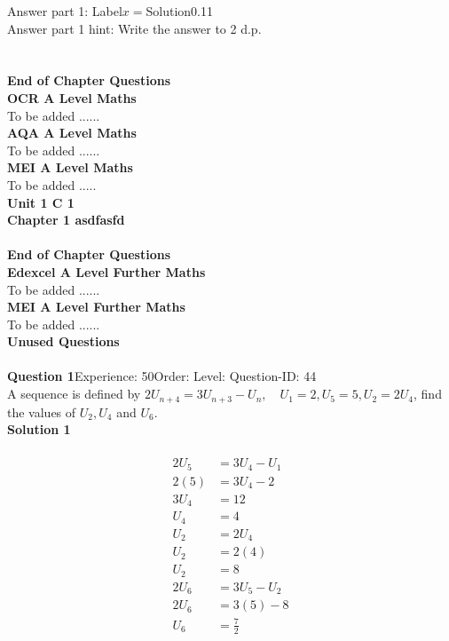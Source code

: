 \documentclass{article}
\begin{document}
Answer part 1: \hspace{10pt}Label\hspace{10pt}$x=$\hspace{10pt}Solution\hspace{10pt}0.11\\
Answer part 1 hint: \hspace{15pt}Write the answer to 2 d.p.\\
\\[4pt]
\\[2pt]
\noindent\large{\textbf{End of Chapter Questions}}\\[15pt]
\noindent\Huge{\textbf{OCR A Level Maths}}\\[5pt]
\noindent\large{To be added ......}\\[20pt]
\noindent\Huge{\textbf{AQA A Level Maths}}\\[5pt]
\noindent\large{To be added ......}\\[20pt]
\noindent\Huge{\textbf{MEI A Level Maths}}\\[5pt]
\noindent\large{To be added .....}\\[20pt]
\noindent\huge{\textbf{Unit 1 C 1}}\\[18pt]
\noindent\huge{\textbf{Chapter 1 asdfasfd}}\\[15pt]
\\[2pt]
\noindent\large{\textbf{End of Chapter Questions}}\\[15pt]
\noindent\Huge{\textbf{Edexcel A Level Further Maths}}\\[5pt]
\noindent\large{To be added ......}\\[20pt]
\noindent\Huge{\textbf{MEI A Level Further Maths}}\\[5pt]
\noindent\large{To be added ......}\\[20pt]
\noindent\Huge{\textbf{Unused Questions}}\\[10pt]
\noindent\large{}\\\noindent\textbf{Question 1}\hspace{20pt}Experience: 50\hspace{20pt}Order: \hspace{20pt}Level: \hspace{20pt}Question-ID: 44\\[2pt]
A sequence is defined by $2U_{n+4}=3U_{n+3}-U_n, \quad U_1=2,U_5=5, U_2=2U_4$, find the values of $U_2,U_4$ and $U_6$.\\[4pt]
\noindent\textbf{Solution 1}\\[2pt]
\\[-35pt]\begin{align*}
2U_5&=3U_4-U_1\\[2pt]
2(5)&=3U_4-2\\[2pt]
3U_4&=12\\[2pt]
U_4&=4\\[12pt]
U_2&=2U_4\\[2pt]
U_2&=2(4)\\[2pt]
U_2&=8\\[12pt]
2U_6&=3U_5-U_2\\[2pt]
2U_6&=3(5)-8\\[2pt]
U_6&=\displaystyle\frac{7}{2}\\
\end{align*}
\end{document}
